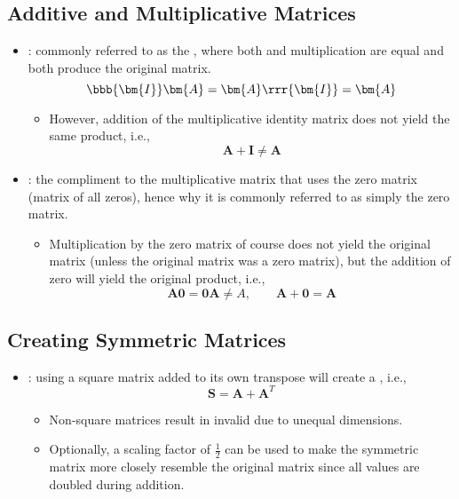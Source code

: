 \begin{itemize}
  \subsection{Additive and Multiplicative Matrices}\label{Additive and Multiplicative Matrices}
  \begin{itemize}
    \item {}: commonly referred to as the \hyperref[Identity and Zero Matrices]{}, where both  and  multiplication are equal and both produce the original matrix.
    \[%
    \bbb{\bm{I}} \bm{A} = \bm{A}\rrr{\bm{I}} = \bm{A}
    \]%
    \begin{itemize}
      \item However, addition of the multiplicative identity matrix does not yield the same product, i.e.,
      \[%
      \bm{A} + \bm{I} \neq \bm{A}
      \]%
    \end{itemize}
  \item {}: the compliment to the multiplicative matrix that uses the zero matrix (matrix of all zeros), hence why it is commonly referred to as simply the zero matrix.
    \begin{itemize}
      \item Multiplication by the zero matrix of course does not yield the original matrix (unless the original matrix was a zero matrix), but the addition of zero will yield the original product, i.e.,
      \[%
      \bm{A0} = \bm{0A}\neq A ,\qquad  \bm{A} + \bm{0} = \bm{A} 
      \]%
    \end{itemize}
  \end{itemize}
  
  \subsection{Creating Symmetric Matrices}\label{Creating Symmetric Matrices}
  \begin{itemize}
    \item {}: using a square matrix  added to its own transpose will create a \hyperref[Symmetric and Skew-Symmetric Matrices]{}, i.e.,
    \[%
    \bm{S} = \bm{A}+\bm{A}^T
    \]%
    \begin{itemize}
      \item Non-square matrices result in invalid \hyperref[Matrix Addition and Subtraction]{} due to unequal dimensions.
      \item Optionally, a scaling factor of \(\frac{1}{2}\) can be used to make the symmetric matrix more closely resemble the original matrix since all values are doubled during addition.
    \end{itemize}
    

\end{itemize}
\end{itemize}
